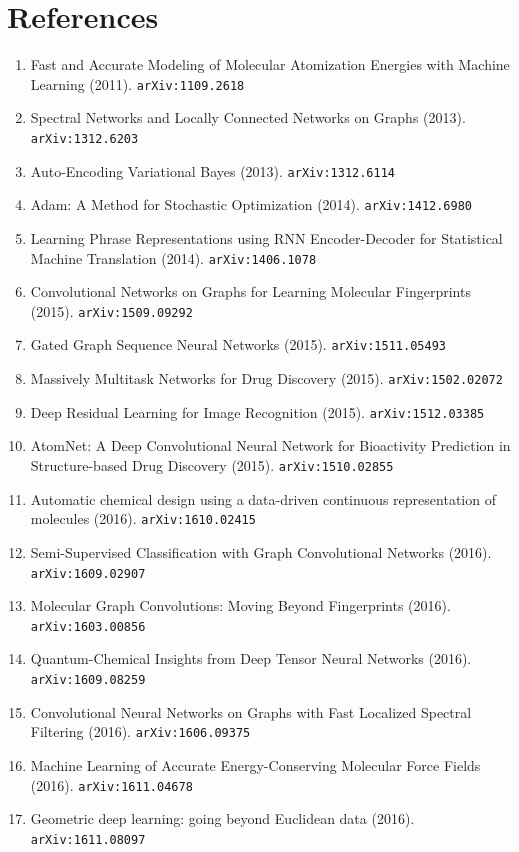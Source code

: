 \documentclass[11pt]{article}
\begin{document}
\section*{References}
\begin{enumerate}\small
  \item Fast and Accurate Modeling of Molecular Atomization Energies with
  Machine Learning (2011). \texttt{arXiv:1109.2618}
  \item Spectral Networks and Locally Connected Networks on Graphs (2013). \texttt{arXiv:1312.6203}
  \item Auto-Encoding Variational Bayes (2013). \texttt{arXiv:1312.6114}
  \item Adam: A Method for Stochastic Optimization (2014). \texttt{arXiv:1412.6980}
  \item Learning Phrase Representations using RNN Encoder-Decoder for
  Statistical Machine Translation (2014). \texttt{arXiv:1406.1078}
  \item Convolutional Networks on Graphs for Learning Molecular Fingerprints (2015). \texttt{arXiv:1509.09292}
  \item Gated Graph Sequence Neural Networks (2015). \texttt{arXiv:1511.05493}
  \item Massively Multitask Networks for Drug Discovery (2015). \texttt{arXiv:1502.02072}
  \item Deep Residual Learning for Image Recognition (2015). \texttt{arXiv:1512.03385}
  \item AtomNet: A Deep Convolutional Neural Network for Bioactivity Prediction
  in Structure-based Drug Discovery (2015). \texttt{arXiv:1510.02855}
  \item Automatic chemical design using a data-driven continuous representation
  of molecules (2016). \texttt{arXiv:1610.02415}
  \item Semi-Supervised Classification with Graph Convolutional Networks (2016). \texttt{arXiv:1609.02907}
  \item Molecular Graph Convolutions: Moving Beyond Fingerprints (2016). \texttt{arXiv:1603.00856}
  \item Quantum-Chemical Insights from Deep Tensor Neural Networks (2016). \texttt{arXiv:1609.08259}
  \item Convolutional Neural Networks on Graphs with Fast Localized Spectral
  Filtering (2016). \texttt{arXiv:1606.09375}
  \item Machine Learning of Accurate Energy-Conserving Molecular Force Fields (2016). \texttt{arXiv:1611.04678}
  \item Geometric deep learning: going beyond Euclidean data (2016). \texttt{arXiv:1611.08097}

\end{enumerate}
\end{document}

